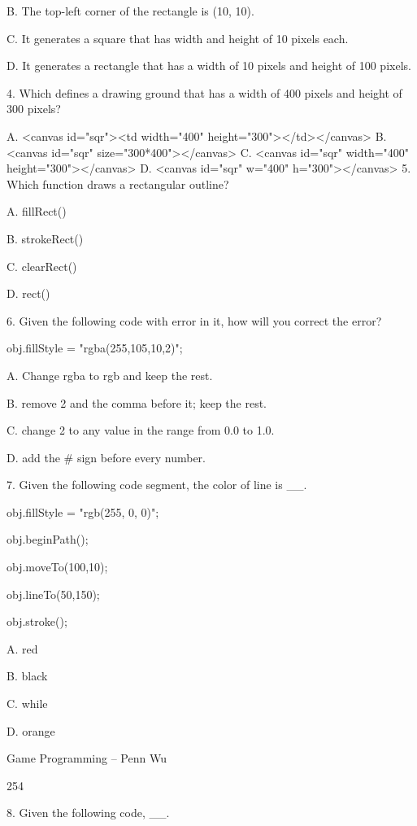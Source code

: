 \documentclass[
]{article}
\begin{document}
B. The top-left corner of the rectangle is (10, 10).

C. It generates a square that has width and height of 10 pixels each.

D. It generates a rectangle that has a width of 10 pixels and height of
100 pixels.

4. Which defines a drawing ground that has a width of 400 pixels and
height of 300 pixels?

A. \textless canvas id="sqr"\textgreater\textless td width="400"
height="300"\textgreater\textless/td\textgreater\textless/canvas\textgreater{}
B. \textless canvas id="sqr"
size="300*400"\textgreater\textless/canvas\textgreater{} C.
\textless canvas id="sqr" width="400"
height="300"\textgreater\textless/canvas\textgreater{} D.
\textless canvas id="sqr" w="400"
h="300"\textgreater\textless/canvas\textgreater{} 5. Which function
draws a rectangular outline?

A. fillRect()

B. strokeRect()

C. clearRect()

D. rect()

6. Given the following code with error in it, how will you correct the
error?

obj.fillStyle = "rgba(255,105,10,2)";

A. Change rgba to rgb and keep the rest.

B. remove 2 and the comma before it; keep the rest.

C. change 2 to any value in the range from 0.0 to 1.0.

D. add the \# sign before every number.

7. Given the following code segment, the color of line is \_\_.

obj.fillStyle = "rgb(255, 0, 0)";

obj.beginPath();

obj.moveTo(100,10);

obj.lineTo(50,150);

obj.stroke();

A. red

B. black

C. while

D. orange

Game Programming -- Penn Wu

254

\protect\hypertarget{index_split_013.htmlux5cux23p255}{}{}

8. Given the following code, \_\_.
\end{document}
